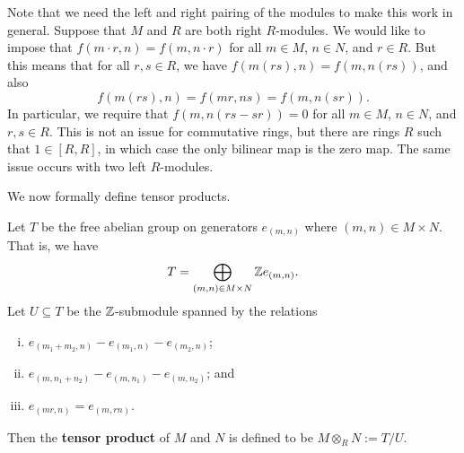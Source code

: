 \begin{remark}{}
    Note that we need the left and right pairing of the modules to make this work 
    in general. Suppose that $M$ and $R$ are both right $R$-modules. We would like 
    to impose that $f(m \cdot r, n) = f(m, n \cdot r)$ for all $m \in M$, $n \in N$, and 
    $r \in R$. But this means that for all $r, s \in R$, we have $f(m(rs), n) 
    = f(m, n(rs))$, and also 
    \[ f(m(rs), n) = f(mr, ns) = f(m, n(sr)). \] 
    In particular, we require that $f(m, n(rs - sr)) = 0$ for all $m \in M$, 
    $n \in N$, and $r, s \in R$. This is not an issue for commutative rings, 
    but there are rings $R$ such that $1 \in [R, R]$, in which case the only 
    bilinear map is the zero map. The same issue occurs with two left $R$-modules. 
\end{remark}

We now formally define tensor products. 

\begin{defn}{}
    Let $T$ be the free abelian group on generators $e_{(m,n)}$ where $(m, n) 
    \in M \times N$. That is, we have 
    \[ T = \bigoplus_{(m, n) \in M \times N} \mathbb{Z} e_{(m,n)}. \] 
    Let $U \subseteq T$ be the $\mathbb{Z}$-submodule spanned by the relations 
    \begin{enumerate}[(i)]
        \item $e_{(m_1 + m_2, n)} - e_{(m_1, n)} - e_{(m_2, n)}$; 
        \item $e_{(m, n_1 + n_2)} - e_{(m, n_1)} - e_{(m, n_2)}$; and 
        \item $e_{(mr, n)} = e_{(m, rn)}$. 
    \end{enumerate}
    Then the {\bf tensor product} of $M$ and $N$ is defined to be 
    $M \otimes_R N := T/U$. 
\end{defn}